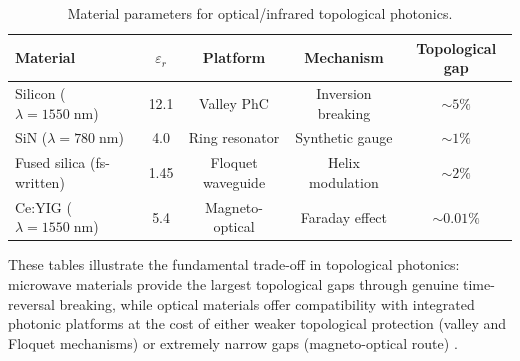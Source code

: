 \begin{table}[htbp]
\centering
\caption{Material parameters for optical/infrared topological photonics.}
\label{tab:appD-optical}
\begin{tabular}{lcccc}
\hline
Material & $\varepsilon_r$ & Platform & Mechanism
& Topological gap \\
\hline
Silicon ($\lambda=1550\;\mathrm{nm}$) & 12.1
& Valley PhC & Inversion breaking & $\sim 5\%$ \\
SiN ($\lambda=780\;\mathrm{nm}$) & 4.0
& Ring resonator & Synthetic gauge & $\sim 1\%$ \\
Fused silica (fs-written) & 1.45
& Floquet waveguide & Helix modulation & $\sim 2\%$ \\
Ce:YIG ($\lambda=1550\;\mathrm{nm}$) & 5.4
& Magneto-optical & Faraday effect & $\sim 0.01\%$ \\
\hline
\end{tabular}
\end{table}

These tables illustrate the fundamental trade-off in topological
photonics: microwave materials provide the largest topological gaps
through genuine time-reversal breaking, while optical materials offer
compatibility with integrated photonic platforms at the cost of either
weaker topological protection (valley and Floquet mechanisms) or
extremely narrow gaps (magneto-optical route)
\cite{ozawa2018topological,he2019silicon,rechtsman2013photonic,
price2022roadmap}.

